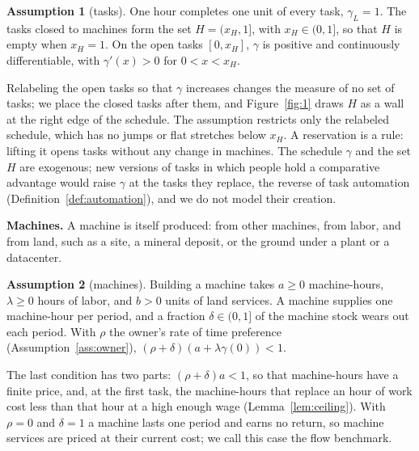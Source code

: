 \documentclass[12pt]{article}
\theoremstyle{plain}
\theoremstyle{definition}
\newtheorem{assumption}{Assumption}
\theoremstyle{remark}
\begin{document}
\begin{assumption}[tasks]\label{ass:tasks}
One hour completes one unit of every task, $\gamma_L=1$. The tasks closed to machines form the set $H=(x_H,1]$, with $x_H\in(0,1]$, so that $H$ is empty when $x_H=1$. On the open tasks $[0,x_H]$, $\gamma$ is positive and continuously differentiable, with $\gamma'(x)>0$ for $0<x<x_H$.
\end{assumption}

Relabeling the open tasks so that $\gamma$ increases changes the measure of no set of tasks; we place the closed tasks after them, and Figure~\ref{fig:1} draws $H$ as a wall at the right edge of the schedule. The assumption restricts only the relabeled schedule, which has no jumps or flat stretches below $x_H$. A reservation is a rule: lifting it opens tasks without any change in machines. The schedule $\gamma$ and the set $H$ are exogenous; new versions of tasks in which people hold a comparative advantage would raise $\gamma$ at the tasks they replace, the reverse of task automation (Definition~\ref{def:automation}), and we do not model their creation.

\textbf{Machines.} A machine is itself produced: from other machines, from labor, and from land, such as a site, a mineral deposit, or the ground under a plant or a datacenter.

\begin{assumption}[machines]\label{ass:machines}
Building a machine takes $a\ge0$ machine-hours, $\lambda\ge0$ hours of labor, and $b>0$ units of land services. A machine supplies one machine-hour per period, and a fraction $\delta\in(0,1]$ of the machine stock wears out each period. With $\rho$ the owner's rate of time preference (Assumption~\ref{ass:owner}), $(\rho+\delta)(a+\lambda\gamma(0))<1$.
\end{assumption}

The last condition has two parts: $(\rho+\delta)a<1$, so that machine-hours have a finite price, and, at the first task, the machine-hours that replace an hour of work cost less than that hour at a high enough wage (Lemma~\ref{lem:ceiling}). With $\rho=0$ and $\delta=1$ a machine lasts one period and earns no return, so machine services are priced at their current cost; we call this case the flow benchmark.
\end{document}
